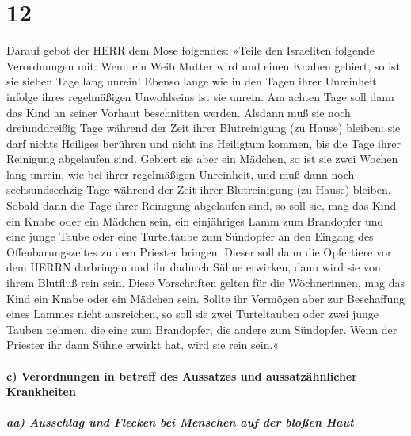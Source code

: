 \hypertarget{section-11}{%
\section{12}\label{section-11}}

Darauf gebot der HERR dem Mose folgendes:
»Teile den Israeliten folgende Verordnungen mit: Wenn ein
Weib Mutter wird und einen Knaben gebiert, so ist sie sieben Tage lang
unrein! Ebenso lange wie in den Tagen ihrer Unreinheit infolge ihres
regelmäßigen Unwohlseins ist sie unrein. Am achten Tage
soll dann das Kind an seiner Vorhaut beschnitten werden.
Alsdann muß sie noch dreiunddreißig Tage während der Zeit
ihrer Blutreinigung (zu Hause) bleiben: sie darf nichts Heiliges
berühren und nicht ins Heiligtum kommen, bis die Tage ihrer Reinigung
abgelaufen sind. Gebiert sie aber ein Mädchen, so ist sie
zwei Wochen lang unrein, wie bei ihrer regelmäßigen Unreinheit, und muß
dann noch sechsundsechzig Tage während der Zeit ihrer Blutreinigung (zu
Hause) bleiben. Sobald dann die Tage ihrer Reinigung
abgelaufen sind, so soll sie, mag das Kind ein Knabe oder ein Mädchen
sein, ein einjähriges Lamm zum Brandopfer und eine junge Taube oder eine
Turteltaube zum Sündopfer an den Eingang des Offenbarungszeltes zu dem
Priester bringen. Dieser soll dann die Opfertiere vor dem
HERRN darbringen und ihr dadurch Sühne erwirken, dann wird sie von ihrem
Blutfluß rein sein. Diese Vorschriften gelten für die Wöchnerinnen, mag
das Kind ein Knabe oder ein Mädchen sein. Sollte ihr
Vermögen aber zur Beschaffung eines Lammes nicht ausreichen, so soll sie
zwei Turteltauben oder zwei junge Tauben nehmen, die eine zum
Brandopfer, die andere zum Sündopfer. Wenn der Priester ihr dann Sühne
erwirkt hat, wird sie rein sein.«

\hypertarget{c-verordnungen-in-betreff-des-aussatzes-und-aussatzuxe4hnlicher-krankheiten}{%
\paragraph{c) Verordnungen in betreff des Aussatzes und aussatzähnlicher
Krankheiten}\label{c-verordnungen-in-betreff-des-aussatzes-und-aussatzuxe4hnlicher-krankheiten}}

\hypertarget{aa-ausschlag-und-flecken-bei-menschen-auf-der-blouxdfen-haut}{%
\subparagraph{aa) Ausschlag und Flecken bei Menschen auf der bloßen
Haut}\label{aa-ausschlag-und-flecken-bei-menschen-auf-der-blouxdfen-haut}}

